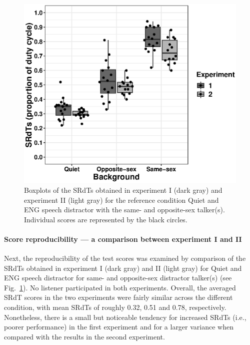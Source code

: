\documentclass[a4paper, twoside]{templates/ociamthesis}
\begin{document}
\begin{figure}[ht]
\center
\includegraphics[width=\textwidth]{figures/Chapt1/Boxplot_SK_vs_HW.eps}
\caption{\label{fig:Cmpr_Exp1_2}{Boxplots of the SRdTs obtained in experiment I (dark gray) and experiment II (light gray) for the reference condition Quiet and ENG speech distractor with the same- and opposite-sex talker(s). Individual scores are represented by the black circles.}}
\end{figure}

\hypertarget{score-reproducibility-a-comparison-between-experiment-i-and-ii}{%
\paragraph{Score reproducibility --- a comparison between experiment I and II}\label{score-reproducibility-a-comparison-between-experiment-i-and-ii}}

\hfill\break
Next, the reproducibility of the test scores was examined by comparison of the SRdTs obtained in experiment I (dark gray) and II (light gray) for Quiet and ENG speech distractor for same- and opposite-sex distractor talker(s) (see Fig.~\ref{fig:Cmpr_Exp1_2}). No listener participated in both experiments. Overall, the averaged SRdT scores in the two experiments were fairly similar across the different condition, with mean SRdTs of roughly 0.32, 0.51 and 0.78, respectively. Nonetheless, there is a small but noticeable tendency for increased SRdTs (i.e., poorer performance) in the first experiment and for a larger variance when compared with the results in the second experiment.\\
\end{document}
